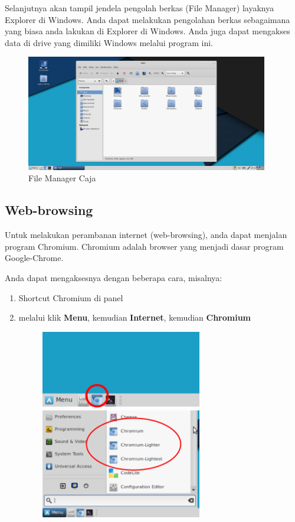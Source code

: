 \documentclass[12pt,]{article}
\begin{document}
	Selanjutnya akan tampil jendela pengolah berkas (File Manager) layaknya Explorer di Windows.
	Anda dapat melakukan pengolahan berkas sebagaimana yang biasa anda lakukan di Explorer di Windows.
	Anda juga dapat mengakses data di drive yang dimiliki Windows melalui program ini.
	\begin{figure}[h]
		\centering
		\includegraphics[width=300pt]{png/caja}
		\caption{File Manager Caja}
	\end{figure}

	\newpage

	\subsection{Web-browsing}

	Untuk melakukan perambanan internet (web-browsing), anda dapat menjalan program Chromium.
	Chromium adalah browser yang menjadi dasar program Google-Chrome.

	Anda dapat mengaksesnya dengan beberapa cara, misalnya:

	\begin{enumerate}
		\item Shortcut Chromium di panel
		\item melalui klik \textbf{Menu}, kemudian \textbf{Internet}, kemudian \textbf{Chromium} 
		\begin{figure}[h]
			\centering
			\includegraphics[width=200pt]{png/panelchromium}
			\includegraphics[width=200pt]{png/menuchromium}
		\end{figure}
	\end{enumerate}
\end{document}
